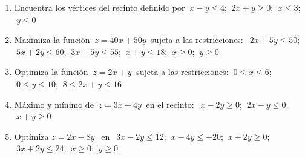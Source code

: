 \begin{adjustwidth}{20pt}{10pt}
\begin{enumerate}[PB. 1. ]	
	 
\item Encuentra los vértices del recinto definido por $\ x-y\le 4$; $\ 2x+y\ge 0$; $\ x\le 3$; $\ y\le 0$

\hspace{-15mm}\vspace{1cm}			
		
\item Maximiza la función $\ z=40x+50y\ $ sujeta a las restricciones: $\ \ 2x+5y\le 50$; $\ 5x+2y\le 60$; $\ 3x+5y\le 55$; $\ x+y\le 18$; $\ x\ge 0$; $\ y\ge 0$

\hspace{-15mm}\vspace{1cm}


\item Optimiza la función $\ z=2x+y\ $ sujeta a las restricciones: $\ 0\le x \le 6$; $\ 0\le y \le 10$; $\ 8\le 2x+y \le 16$

\hspace{-15mm}

\hspace{-15mm}\vspace{1cm}


\item Máximo y mínimo de $\ z=3x+4y\ $ en el recinto: $\ \ x-2y\ge 0$; $\ 2x-y\le 0$; $\ x+y\ge 0$

\hspace{-15mm}\vspace{1cm}


\item Optimiza $z=2x-8y\ \ $ en $\ \ 3x-2y\le 12$; $\ x-4y\le -20$; $\ x+2y\ge 0$; $\ 3x+2y\le 24$; $\ x\ge 0$; $\ y\ge 0$

\hspace{-15mm}\vspace{1cm}



\end{enumerate}
\end{adjustwidth}
